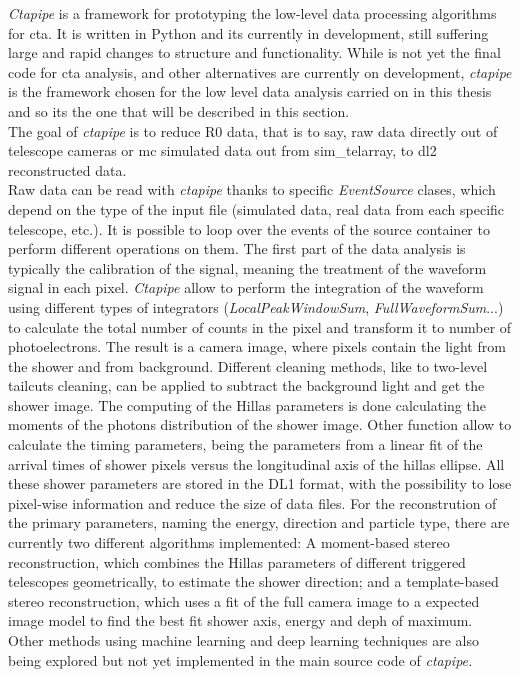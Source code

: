 \documentclass[main.tex]{subfiles}
\begin{document}
\textit{Ctapipe} \cite{ctapipe} is a framework for prototyping the low-level data processing algorithms for \gls{cta}. It is written in Python and its currently in development, still suffering large and rapid changes to structure and functionality. While is not yet the final code for \gls{cta} analysis, and other alternatives are currently on development, \textit{ctapipe} is the framework chosen for the low level data analysis carried on in this thesis and so its the one that will be described in this section.\\
The goal of \textit{ctapipe} is to reduce R0 data, that is to say, raw data directly out of telescope cameras or \gls{mc} simulated data out from sim\_telarray, to dl2 reconstructed data.\\
Raw data can be read with \textit{ctapipe} thanks to specific \textit{EventSource} clases, which depend on the type of the input file (simulated data, real data from each specific telescope, etc.). It is possible to loop over the events of the source container to perform different operations on them. The first part of the data analysis is typically the calibration of the signal, meaning the treatment of the waveform signal in each pixel. \textit{Ctapipe} allow to perform the integration of the waveform using different types of integrators (\textit{LocalPeakWindowSum}, \textit{FullWaveformSum}...) to calculate the total number of counts in the pixel and transform it to number of photoelectrons. The result is a camera image, where pixels contain the light from the shower and from background. Different cleaning methods, like to two-level tailcuts cleaning, can be applied to subtract the background light and get the shower image. The computing of the Hillas parameters is done calculating the moments of the photons distribution of the shower image. Other function allow to calculate the timing parameters, being the parameters from a linear fit of the arrival times of shower pixels versus the longitudinal axis of the hillas ellipse. All these shower parameters are stored in the DL1 format, with the possibility to lose pixel-wise information and reduce the size of data files. For the reconstrution of the primary parameters, naming the energy, direction and particle type, there are currently two different algorithms implemented: A moment-based stereo reconstruction, which combines the Hillas parameters of different triggered telescopes geometrically, to estimate the shower direction; and a template-based stereo reconstruction, which uses a fit of the full camera image to a expected image model to find the best fit shower axis, energy and deph of maximum. Other methods using machine learning and deep learning techniques are also being explored but not yet implemented in the main source code of \textit{ctapipe.}\\
\end{document}
